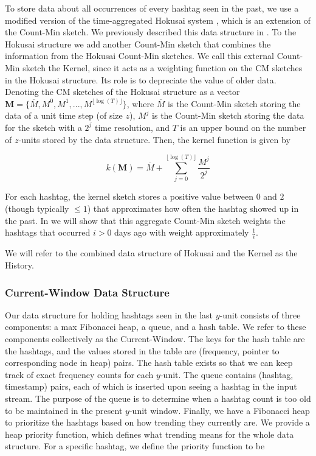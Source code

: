 \documentclass[twoside]{article}
\newcommand{\nref}[1]
 {\textbf{\nameref{#1}}}
\newcommand{\cc}[1]
 {\textbf{\cite{#1}}}
\begin{document}
{To store data about all occurrences of every hashtag seen in the past, we use a modified version of the time-aggregated Hokusai system \cc{Matusevych:2012}, which is an extension of the Count-Min sketch. We previously described this data structure in \nref{sec:PreviousWork}. 
To the Hokusai structure we add another Count-Min sketch that combines the information from the Hokusai Count-Min sketches. We call this external Count-Min sketch the Kernel, since it acts as a weighting function on the CM sketches in the Hokusai structure. Its role is to depreciate the value of older data.
Denoting the CM sketches of the Hokusai structure as a vector $\textbf{M} = \{\overline{M}, M^0, M^1, ..., M^{{\lfloor {\log(T)} \rfloor}}\}$, where $\overline{M}$ is the Count-Min sketch storing the data of a unit time step (of size $z$), $M^j$ is the Count-Min sketch storing the data for the sketch with a $2^j$ time resolution, and $T$ is an upper bound on the number of $z$-units stored by the data structure. Then, the kernel function is given by

\begin{equation} 
\label{eq:kernel}
\textit{k}(\textbf{M}) = \overline{M} + \sum\limits_{j=0}^{{\lfloor \log⁡(T) \rfloor}} \frac{M^j}{2^j}
\end{equation}

For each hashtag, the kernel sketch stores a positive value between $0$ and $2$ (though typically $\leq 1$) that approximates how often the hashtag showed up in the past. In \nref{sec:Correctness} we will show that this aggregate Count-Min sketch weights the hashtags that occurred $i > 0$ days ago with weight approximately $\frac{1}{i}$.

We will refer to the combined data structure of Hokusai and the Kernel as the History.

\subsubsection{Current-Window Data Structure}

Our data structure for holding hashtags seen in the last $y$-unit consists of three components: a max Fibonacci heap, a queue, and a hash table.  We refer to these components collectively as the Current-Window.
The keys for the hash table are the hashtags, and the values stored in the table are (frequency, pointer to corresponding node in heap) pairs. The hash table exists so that we can keep track of exact frequency counts for each $y$-unit.
The queue contains (hashtag, timestamp) pairs, each of which is inserted upon seeing a hashtag in the input stream. The purpose of the queue is to determine when a hashtag count is too old to be maintained in the present $y$-unit window.
Finally, we have a Fibonacci heap to prioritize the hashtags based on how trending they currently are.
We provide a heap priority function, which defines what trending means for the whole data structure. 
For a specific hashtag, we define the priority function to be

}
\end{document}
